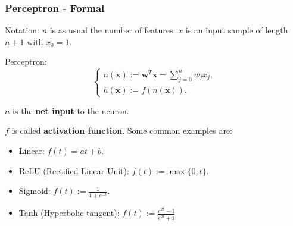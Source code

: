 \documentclass{beamer}
\begin{document}
	\begin{frame}
		\frametitle{Perceptron - Formal}
		Notation: $n$ is as usual the number of features. $x$ is an input sample of length $n+1$ with $x_0 = 1$.
		
		\vspace{5mm}
		
		Perceptron:
		\begin{equation*}
			\begin{cases}
				n(\bm{x}) := \bm{w}^T \bm{x} = \sum_{j=0}^{n} w_j x_j,\\
				h(\bm{x}) := f(n(\bm{x})).
			\end{cases}
		\end{equation*}
	
		$n$ is the \textbf{net input} to the neuron.
		
		\vspace{5mm}
		
		$f$ is called \textbf{activation function}. Some common examples are:
		\begin{itemize}
			\item Linear:  $f(t) = at + b$.
			\item ReLU (Rectified Linear Unit): $f(t) := \max\{0, t\}$.
			\item Sigmoid: $f(t) := \frac{1}{1 + e^{-t}}$.
			\item Tanh (Hyperbolic tangent): $f(t) := \frac{e^{2t}-1}{e^{2t}+1}$
		\end{itemize}
		
	\end{frame}
	
\end{document}
